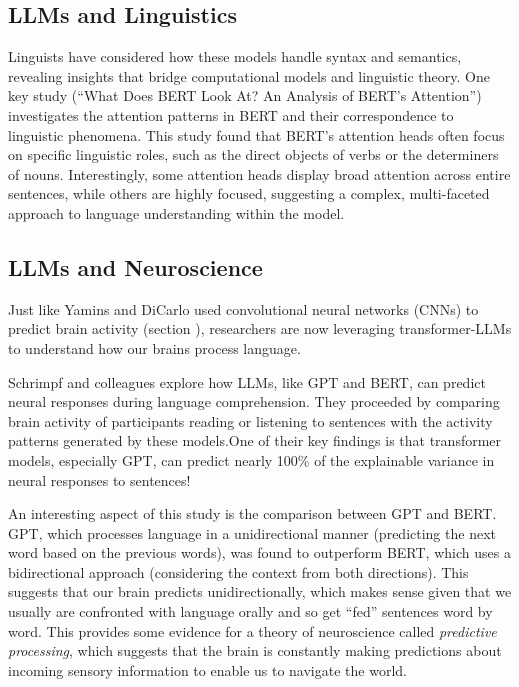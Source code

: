 \subsection{LLMs and Linguistics}

Linguists have considered how these models handle syntax and semantics, revealing insights that bridge computational models and linguistic theory. One key study (``What Does BERT Look At? An Analysis of BERT's Attention'') investigates the attention patterns in BERT and their correspondence to linguistic phenomena. This study found that BERT's attention heads often focus on specific linguistic roles, such as the direct objects of verbs or the determiners of nouns. Interestingly, some attention heads display broad attention across entire sentences, while others are highly focused, suggesting a complex, multi-faceted approach to language understanding within the model. 

\subsection{LLMs and Neuroscience}

Just like Yamins and DiCarlo used convolutional neural networks (CNNs) to predict brain activity (section ), researchers are now leveraging transformer-LLMs to understand how our brains process language. 

Schrimpf and colleagues \cite{schrimpf2021neural} explore how LLMs, like GPT and BERT, can predict neural responses during language comprehension. They proceeded by comparing  brain activity of participants reading or listening to sentences with the activity patterns generated by these models.One of their key findings is that transformer models, especially GPT, can predict nearly 100\% of the explainable variance in neural responses to sentences! 

An interesting aspect of this study is the comparison between GPT and BERT. GPT, which processes language in a unidirectional manner (predicting the next word based on the previous words), was found to outperform BERT, which uses a bidirectional approach (considering the context from both directions). This suggests that our brain predicts unidirectionally, which  makes sense given that we usually are confronted with language orally and so get ``fed'' sentences word by word. This provides some evidence for a theory of neuroscience called \emph{predictive processing}, which suggests that the brain is constantly making predictions about incoming sensory information to enable us to navigate the world.

